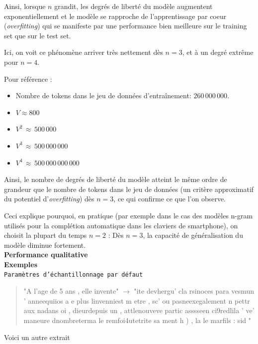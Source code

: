 Ainsi, lorsque $n$ grandit, les degrés de liberté du modèle augmentent
exponentiellement et le modèle se rapproche de l'apprentissage par coeur
(\textit{overfitting}) qui se manifeste par une performance bien meilleure
sur le training set que sur le test set.

Ici, on voit ce phénomène arriver très nettement dès \(n=3\), et à un
degré extrême pour \(n=4\).

Pour référence :

\begin{itemize}
\item
  Nombre de tokens dans le jeu de données d'entraînement:
  $260\,000\,000$.
\item
  $V \approx 800$
\item
  $V^2\,\approx\,500\,000$
\item
  $V^3\,\approx\,500\,000\,000$
\item
  $V^4\,\approx\,500\,000\,000\,000$
\end{itemize}

Ainsi, le nombre de degrés de liberté du modèle atteint le même ordre
de grandeur que le nombre de tokens dans le jeu de données (un critère
approximatif du potentiel d'\textit{overfitting}) dès \(n=3\), ce qui
confirme ce que l'on observe.

Ceci explique pourquoi, en pratique (par exemple dans le cas des modèles
n-gram utilisés pour la complétion automatique dans les claviers de
smartphone), on choisit la plupart du temps \(n=2\) : Dès \(n=3\), la
capacité de généralisation du modèle diminue fortement. \\


\noindent{}\textbf{Performance qualitative} \\

\textbf{Exemples} \\


\noindent{} \texttt{Paramètres d'échantillonnage par défaut}

  \begin{quotation}
  "A l'age de 5 ans , elle invente" $\rightarrow$ "ite devhergu' cla rsinoces para vesmun ' anneequiios a e plus linvenniest m etre  , sc' ou pasneexegalement n pettr aux nadans oi , dieurdepuis un  , attlenouveve partic asssseen ci9redlila ' ve' maneure dnombreterma le remfoi4utetrite sa ment h ) , la le marfils : sid "
  \end{quotation}


Voici un autre extrait

